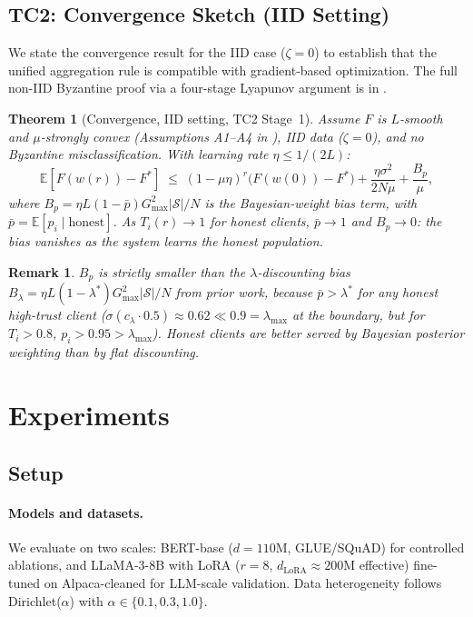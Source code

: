 \documentclass{article}
\newtheorem{theorem}{Theorem}
\newtheorem{remark}{Remark}
\newcommand{\E}{\mathbb{E}}
\newcommand{\calS}{\mathcal{S}}      %
\begin{document}
\subsection{TC2: Convergence Sketch (IID Setting)}
\label{sec:convergence}

We state the convergence result for the IID case ($\zeta = 0$) to establish
that the unified aggregation rule is compatible with gradient-based
optimization.
The full non-IID Byzantine proof via a four-stage Lyapunov argument is in
.

\begin{theorem}[Convergence, IID setting, TC2 Stage~1]
\label{thm:convergence_iid}
Assume $F$ is $L$-smooth and $\mu$-strongly convex (Assumptions A1--A4 in
), IID data ($\zeta = 0$), and no Byzantine
misclassification.
With learning rate $\eta \leq 1/(2L)$:
\[
  \E[F(w(r)) - F^*]
  \;\leq\;
  (1 - \mu\eta)^r \bigl(F(w(0)) - F^*\bigr)
  + \frac{\eta \sigma^2}{2N\mu}
  + \frac{B_p}{\mu},
\]
where $B_p = \eta L (1 - \bar{p}) G_{\max}^2 |\calS| / N$ is the
Bayesian-weight bias term, with $\bar{p} = \E[p_i \mid \text{honest}]$.
As $T_i(r) \to 1$ for honest clients, $\bar{p} \to 1$ and $B_p \to 0$:
the bias vanishes as the system learns the honest population.
\end{theorem}

\begin{remark}
$B_p$ is strictly smaller than the $\lambda$-discounting bias
$B_\lambda = \eta L (1-\lambda^*) G_{\max}^2 |\calS|/N$ from prior work,
because $\bar{p} > \lambda^*$ for any honest high-trust client
($\sigma(c_\lambda \cdot 0.5) \approx 0.62 \ll 0.9 = \lambda_{\max}$ at the
boundary, but for $T_i > 0.8$, $p_i > 0.95 > \lambda_{\max}$).
Honest clients are better served by Bayesian posterior weighting than by flat
discounting.
\end{remark}

\section{Experiments}
\label{sec:experiments}

\subsection{Setup}
\label{sec:exp_setup}

\paragraph{Models and datasets.}
We evaluate on two scales: BERT-base ($d=110$M, GLUE/SQuAD) for controlled
ablations, and LLaMA-3-8B with LoRA ($r=8$, $d_{\mathrm{LoRA}} \approx 200$M
effective) fine-tuned on Alpaca-cleaned for LLM-scale validation.
Data heterogeneity follows Dirichlet($\alpha$) with
$\alpha \in \{0.1, 0.3, 1.0\}$.
\end{document}
